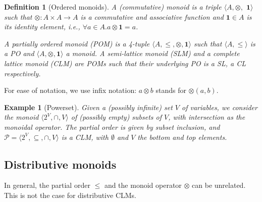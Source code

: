 \documentclass[a4paper]{elsarticle}
\newtheorem{definition}{Definition}
\newtheorem{example}{Example}
\newcommand{\monop}{\otimes}
\newcommand{\1}{\mathbf{1}}
\begin{document}
%
%

\begin{definition}[Ordered monoids]\label{defn:clm}
	A (commutative) monoid is a triple
	$\langle A, \monop,$ $\1 \rangle$ such that $\monop: A \times A \rightarrow A$ is
	a commutative and associative function and $\1 \in A$ is its \emph{identity} element,
	i.e., $\forall a \in A. a \monop \1 = a$.
	
	A partially ordered monoid (POM) is a 4-tuple
	$\langle A, \leq, \monop, \1 \rangle$ such that 	
	$\langle A, \leq \rangle$ is a PO and $\langle A, \monop, \1 \rangle$ a monoid.
	A semi-lattice monoid (SLM) and a complete lattice monoid (CLM) are 
	POMs such that their underlying PO is a SL, a CL respectively.
\end{definition}

For ease of notation, we use infix notation: $a \monop b$ stands for $\monop(a,b)$.

\begin{example}[Powerset]\label{ex:powerset}
	Given a (possibly infinite) set $V$ of variables, we consider
	the monoid $\langle 2^V, \cap, V \rangle$
	of (possibly empty) subsets of $V$, with intersection as the monoidal operator.
	The partial order is given by subset inclusion, and 
	$\mathcal{P} = \langle 2^V, \subseteq, \cap, V \rangle$
	is a CLM, with $\emptyset$ and $V$ the bottom and top elements. %
\end{example}

\subsection{Distributive monoids}

In general, the partial order $\leq$ and the monoid operator $\otimes$ can be unrelated.
This is not the case for distributive CLMs.
\end{document}
